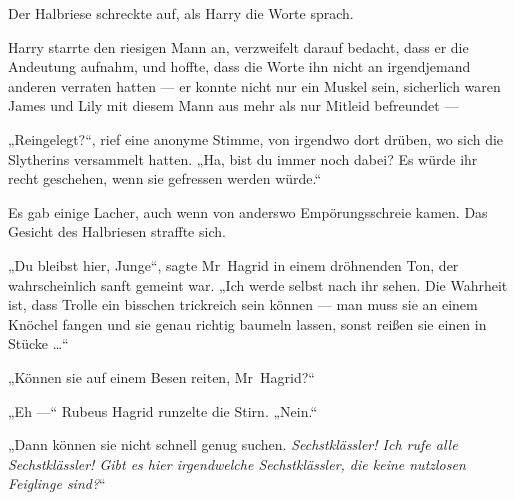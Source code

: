 Der Halbriese schreckte auf, als Harry die Worte sprach.

Harry starrte den riesigen Mann an, verzweifelt darauf bedacht, dass er die Andeutung aufnahm, und hoffte, dass die Worte ihn nicht an irgendjemand anderen verraten hatten — er konnte nicht nur ein Muskel sein, sicherlich waren James und Lily mit diesem Mann aus mehr als nur Mitleid befreundet —

„Reingelegt?“, rief eine anonyme Stimme, von irgendwo dort drüben, wo sich die Slytherins versammelt hatten.
„Ha, bist du immer noch dabei? Es würde ihr recht geschehen, wenn sie gefressen werden würde.“

Es gab einige Lacher, auch wenn von anderswo Empörungsschreie kamen. Das Gesicht des Halbriesen straffte sich.

„Du bleibst hier, Junge“, sagte Mr~Hagrid in einem dröhnenden Ton, der wahrscheinlich sanft gemeint war.
„Ich werde selbst nach ihr sehen. Die Wahrheit ist, dass Trolle ein bisschen trickreich sein können — man muss sie an einem Knöchel fangen und sie genau richtig baumeln lassen, sonst reißen sie einen in Stücke …“

„Können sie auf einem Besen reiten, Mr~Hagrid?“

„Eh —“ Rubeus Hagrid runzelte die Stirn.
„Nein.“

„Dann können sie nicht schnell genug suchen. \emph{Sechstklässler! Ich rufe alle Sechstklässler! Gibt es hier irgendwelche Sechstklässler, die keine nutzlosen Feiglinge sind?}“

